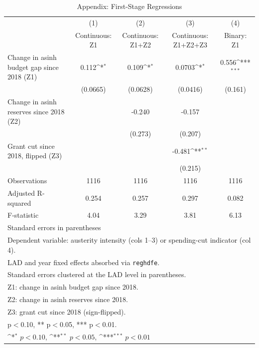 \begin{table}[htbp]\centering
\def\sym#1{\ifmmode^{#1}\else\(^{#1}\)\fi}
\caption{Appendix: First-Stage Regressions}
\begin{tabular}{l*{4}{c}}
\toprule
                    &\multicolumn{1}{c}{(1)}&\multicolumn{1}{c}{(2)}&\multicolumn{1}{c}{(3)}&\multicolumn{1}{c}{(4)}\\
                    &\multicolumn{1}{c}{Continuous: Z1}&\multicolumn{1}{c}{Continuous: Z1+Z2}&\multicolumn{1}{c}{Continuous: Z1+Z2+Z3}&\multicolumn{1}{c}{Binary: Z1}\\
\midrule
Change in asinh budget gap since 2018 (Z1)&       0.112\sym{*}  &       0.109\sym{*}  &      0.0703\sym{*}  &       0.556\sym{***}\\
                    &    (0.0665)         &    (0.0628)         &    (0.0416)         &     (0.161)         \\
\addlinespace
Change in asinh reserves since 2018 (Z2)&                     &      -0.240         &      -0.157         &                     \\
                    &                     &     (0.273)         &     (0.207)         &                     \\
\addlinespace
Grant cut since 2018, flipped (Z3)&                     &                     &      -0.481\sym{**} &                     \\
                    &                     &                     &     (0.215)         &                     \\
\midrule
Observations        &        1116         &        1116         &        1116         &        1116         \\
Adjusted R-squared  &       0.254         &       0.257         &       0.297         &       0.082         \\
F-statistic         &        4.04         &        3.29         &        3.81         &        6.13         \\
\bottomrule
\multicolumn{5}{l}{\footnotesize Standard errors in parentheses}\\
\multicolumn{5}{l}{\footnotesize Dependent variable: austerity intensity (cols 1--3) or spending-cut indicator (col 4).}\\
\multicolumn{5}{l}{\footnotesize LAD and year fixed effects absorbed via \texttt{reghdfe}.}\\
\multicolumn{5}{l}{\footnotesize Standard errors clustered at the LAD level in parentheses.}\\
\multicolumn{5}{l}{\footnotesize Z1: change in asinh budget gap since 2018.}\\
\multicolumn{5}{l}{\footnotesize Z2: change in asinh reserves since 2018.}\\
\multicolumn{5}{l}{\footnotesize Z3: grant cut since 2018 (sign-flipped).}\\
\multicolumn{5}{l}{\footnotesize * p$<$0.10, ** p$<$0.05, *** p$<$0.01.}\\
\multicolumn{5}{l}{\footnotesize \sym{*} \(p<0.10\), \sym{**} \(p<0.05\), \sym{***} \(p<0.01\)}\\
\end{tabular}
\end{table}
